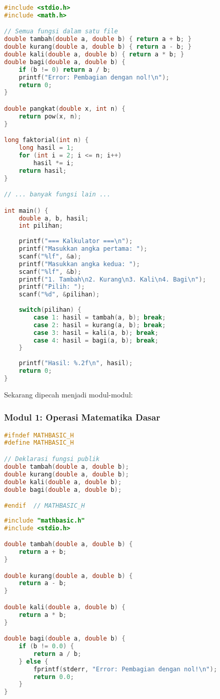 \documentclass[../main.tex]{subfiles}
\begin{document}
\begin{lstlisting}[language=C, caption={kalkulator\_monolitik.c}]
#include <stdio.h>
#include <math.h>

// Semua fungsi dalam satu file
double tambah(double a, double b) { return a + b; }
double kurang(double a, double b) { return a - b; }
double kali(double a, double b) { return a * b; }
double bagi(double a, double b) {
    if (b != 0) return a / b;
    printf("Error: Pembagian dengan nol!\n");
    return 0;
}

double pangkat(double x, int n) {
    return pow(x, n);
}

long faktorial(int n) {
    long hasil = 1;
    for (int i = 2; i <= n; i++)
        hasil *= i;
    return hasil;
}

// ... banyak fungsi lain ...

int main() {
    double a, b, hasil;
    int pilihan;
    
    printf("=== Kalkulator ===\n");
    printf("Masukkan angka pertama: ");
    scanf("%lf", &a);
    printf("Masukkan angka kedua: ");
    scanf("%lf", &b);
    printf("1. Tambah\n2. Kurang\n3. Kali\n4. Bagi\n");
    printf("Pilih: ");
    scanf("%d", &pilihan);
    
    switch(pilihan) {
        case 1: hasil = tambah(a, b); break;
        case 2: hasil = kurang(a, b); break;
        case 3: hasil = kali(a, b); break;
        case 4: hasil = bagi(a, b); break;
    }
    
    printf("Hasil: %.2f\n", hasil);
    return 0;
}
\end{lstlisting}

Sekarang dipecah menjadi modul-modul:

\subsubsection{Modul 1: Operasi Matematika Dasar}
\begin{lstlisting}[language=C, caption={mathbasic.h - header operasi dasar}]
#ifndef MATHBASIC_H
#define MATHBASIC_H

// Deklarasi fungsi publik
double tambah(double a, double b);
double kurang(double a, double b);
double kali(double a, double b);
double bagi(double a, double b);

#endif  // MATHBASIC_H
\end{lstlisting}

\begin{lstlisting}[language=C, caption={mathbasic.c - implementasi operasi dasar}]
#include "mathbasic.h"
#include <stdio.h>

double tambah(double a, double b) {
    return a + b;
}

double kurang(double a, double b) {
    return a - b;
}

double kali(double a, double b) {
    return a * b;
}

double bagi(double a, double b) {
    if (b != 0.0) {
        return a / b;
    } else {
        fprintf(stderr, "Error: Pembagian dengan nol!\n");
        return 0.0;
    }
}
\end{lstlisting}
\end{document}
